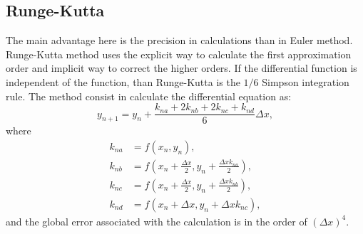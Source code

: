 \begin{anexosenv}
\chapter{Runge-Kutta}
\label{sec:RK}
    The main advantage here is the precision in calculations than in Euler method. Runge-Kutta method uses the explicit way to calculate the first approximation order and implicit way to correct the higher orders. If the differential function is independent of the function, than Runge-Kutta is the $1/6$ Simpson integration rule. The method consist in calculate the differential equation as:
    \begin{equation}
        y_{n+1} = y_n + \frac{k_{na}+2k_{nb}+2k_{nc}+k_{nd}}{6}\Delta x,
        \label{equ:RK}
    \end{equation}
where
    \begin{subequations}
        \begin{align}
            k_{na} &= f(x_n, y_n),\\
            k_{nb} &= f\left(x_n +\frac{\Delta x}{2}, y_n+\frac{\Delta x k_{na}}{2}\right),\\
            k_{nc} &= f\left(x_n +\frac{\Delta x}{2}, y_n+\frac{\Delta x k_{nb}}{2}\right),\\
            k_{nd} &= f(x_n +\Delta x, y_n +\Delta x k_{nc}),
        \end{align}
    \end{subequations}
and the global error associated with the calculation is in the order of $(\Delta x)^4$.


\end{anexosenv}
